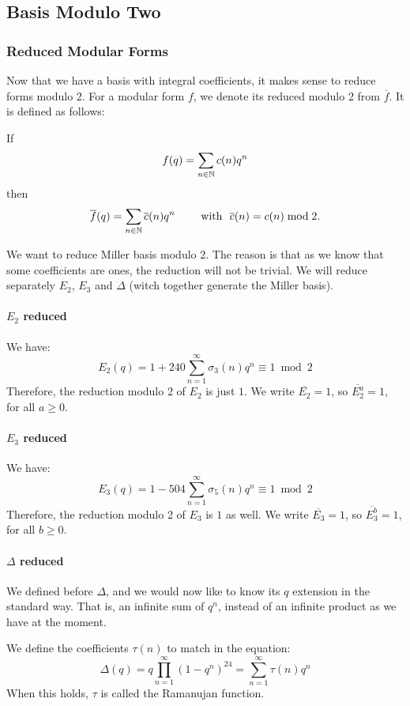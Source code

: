 \subsection{Basis Modulo Two}
\subsubsection{Reduced Modular Forms}
Now that we have a basis with integral coefficients, it makes sense to reduce forms modulo 2.
For a modular form $f$, we denote its reduced modulo 2 from $\overline{f}$. It is defined as follows:

If
$$
f(q) = \sum_{n \in \mathbb{N}} c(n)q^n
$$
then
$$
\overline{f}(q) = \sum_{n \in \mathbb{N}} \overline{c}(n)q^n 
\qquad \text{ with } \ \overline{c}(n) = c(n) \bmod 2 .
$$

We want to reduce Miller basis modulo 2.
The reason is that as we know that some coefficients are ones, the reduction will not be trivial.
We will reduce separately $E_2$, $E_3$ and $\Delta$ (witch together generate the Miller basis).

\paragraph{$E_2$ reduced}
We have:
$$
E_2(q) 
= 1 + 240 \sum_{n=1}^{\infty} \sigma_{3}(n)q^n
\equiv 1 \bmod 2
$$
Therefore, the reduction modulo 2 of $E_2$ is just $1$.
We write $\overline{E_2} = 1$, so $\overline{E_2^a} = 1$, for all $a \geq 0$.

\paragraph{$E_3$ reduced}
We have:
$$
E_3(q)
= 1 - 504 \sum_{n=1}^{\infty} \sigma_{5}(n)q^n
\equiv 1 \bmod 2
$$
Therefore, the reduction modulo 2 of $E_3$ is $1$ as well.
We write $\overline{E_3} = 1$, so $\overline{E_3^b} = 1$, for all $b \geq 0$.

\paragraph{$\Delta$ reduced}
We defined before $\Delta$, and we would now like to know its $q$ extension in the standard way.
That is, an infinite sum of $q^n$, instead of an infinite product as we have at the moment.

We define the coefficients $\tau(n)$ to match in the equation: 
$$
\Delta(q) 
= q \prod_{n=1}^{\infty} (1-q^n)^{24} 
= \sum_{n=1}^{\infty} \tau(n)q^n
$$
When this holds, $\tau$ is called the Ramanujan function.

